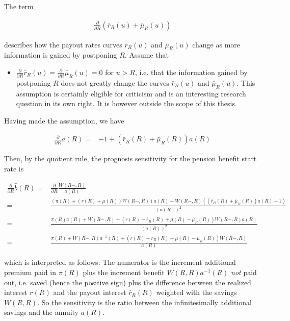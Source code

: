 \documentclass{article}
\newcommand{\1}[1]{\mathbbm{1}_{\left\lbrace #1 \right\rbrace}}
\theoremstyle{break}
\theoremstyle{remark}
\numberwithin{equation}{section}
\begin{document}
The term

\begin{align*}
	\frac{\partial}{\partial R} \left(\bar{r}_R(u)+\bar{\mu}_R(u)\right)
\end{align*}

describes how the payout rates curves $\bar{r}_R(u)$ and $\bar{\mu}_R(u)$ change as more information is gained by postponing $R$. Assume that

\begin{itemize}
	\item $\frac{\partial}{\partial R} \bar{r}_R(u) = \frac{\partial}{\partial R} \bar{\mu}_R(u) = 0$ for $u > R$, i.e. that the information gained by postponing $R$ does not greatly change the curves $\bar{r}_R(u)$ and $\bar{\mu}_R(u)$. This assumption is certainly eligible for criticism and is an interesting research question in its own right. It is however outside the scope of this thesis.
\end{itemize}

Having made the assumption, we have

\begin{align*}
	\frac{\partial}{\partial R} a(R) =& - 1 +  \left(\bar{r}_R(R)+\bar{\mu}_R(R)\right) a(R)
\end{align*}

Then, by the quotient rule, the prognosis sensitivity for the pension benefit start rate is

\begin{align*}
	\frac{\partial}{\partial R} \hat{b}(R) =& \frac{\partial}{\partial R} \frac{W(R-,R)}{a(R)} \\
	=& \frac{\left( \pi(R) + \left(r(R) + \mu(R)\right) W(R-,R) \right) a(R) - W(R-,R) \left( \left(\bar{r}_R(R) + \bar{\mu}_R(R)\right) a(R) - 1 \right)}{\left( a(R) \right)^2} \\
	=& \frac{\pi(R) a(R)  + W(R-,R) + \left( r(R) - \bar{r}_R(R) + \mu(R) - \bar{\mu}_R(R) \right) W(R-,R) a(R)}{\left( a(R) \right)^2} \\
	=& \frac{\pi(R)  + W(R-,R) a^{-1}(R) + \left( r(R) - \bar{r}_R(R) + \mu(R) - \bar{\mu}_R(R) \right) W(R-,R)}{ a(R) }
\end{align*}

which is interpreted as follows: The numerator is the increment additional premium paid in $\pi(R)$ plus the increment benefit $W(R,R) a^{-1}(R)$ \textit{not} paid out, i.e. saved (hence the positive sign) plus the difference between the realized interest $r(R)$ and the payout interest $\bar{r}_R(R)$ weighted with the savings $W(R,R)$. So the sensitivity is the ratio between the infinitesimally additional savings and the annuity $a(R)$.
\end{document}
